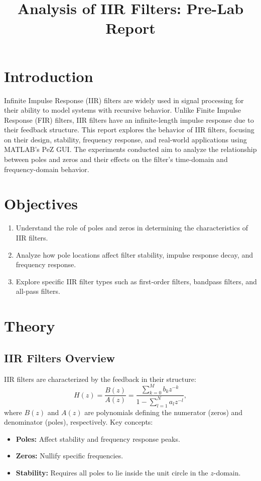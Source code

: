 \documentclass[12pt]{article}
\title{Analysis of IIR Filters: Pre-Lab Report}
\author{}
\date{}
\begin{document}
	
	\maketitle
	
	\section*{Introduction}
	Infinite Impulse Response (IIR) filters are widely used in signal processing for their ability to model systems with recursive behavior. Unlike Finite Impulse Response (FIR) filters, IIR filters have an infinite-length impulse response due to their feedback structure. This report explores the behavior of IIR filters, focusing on their design, stability, frequency response, and real-world applications using MATLAB's PeZ GUI. The experiments conducted aim to analyze the relationship between poles and zeros and their effects on the filter's time-domain and frequency-domain behavior.
	
	\section*{Objectives}
	\begin{enumerate}
		\item Understand the role of poles and zeros in determining the characteristics of IIR filters.
		\item Analyze how pole locations affect filter stability, impulse response decay, and frequency response.
		\item Explore specific IIR filter types such as first-order filters, bandpass filters, and all-pass filters.
	\end{enumerate}
	
	\section*{Theory}
	\subsection*{IIR Filters Overview}
	IIR filters are characterized by the feedback in their structure:
	\[
	H(z) = \frac{B(z)}{A(z)} = \frac{\sum_{k=0}^{M} b_k z^{-k}}{1 - \sum_{l=1}^{N} a_l z^{-l}},
	\]
	where $B(z)$ and $A(z)$ are polynomials defining the numerator (zeros) and denominator (poles), respectively. Key concepts:
	\begin{itemize}
		\item \textbf{Poles:} Affect stability and frequency response peaks.
		\item \textbf{Zeros:} Nullify specific frequencies.
		\item \textbf{Stability:} Requires all poles to lie inside the unit circle in the $z$-domain.
	\end{itemize}
	
\end{document}

